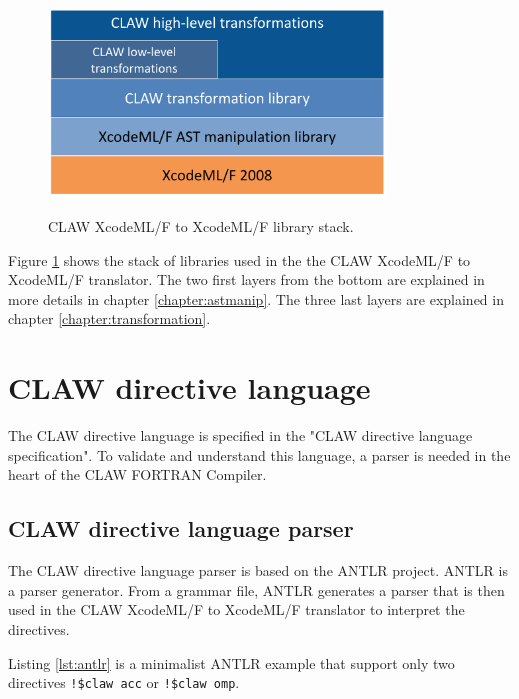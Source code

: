 \documentclass[a4paper, 11pt]{report}
\def\clawfcomp{CLAW FORTRAN Compiler\xspace}
\def\xcodeml{XcodeML/F\xspace}
\begin{document}
\begin{figure}[!ht]
  \centering
  \includegraphics[width=0.8\textwidth]{resources/cx2x_stack.png} \\
  \caption{CLAW \xcodeml to \xcodeml library stack.}
  \label{fig:cx2x_stack}
\end{figure}

Figure \ref{fig:cx2x_stack} shows the stack of libraries used in the the CLAW \xcodeml to \xcodeml translator. The two first layers from the bottom are explained in more details in chapter \ref{chapter:astmanip}. The three last layers are explained in chapter \ref{chapter:transformation}.


\chapter{CLAW directive language}
The CLAW directive language is specified in the "CLAW directive language specification". To validate and understand this language, a parser is needed in the heart of the \clawfcomp.

\section{CLAW directive language parser}
The CLAW directive language parser is based on the ANTLR project\cite{Parr:2013:DAR:2501720}. ANTLR is a parser generator. From a grammar file, ANTLR generates a parser that is then used in the CLAW \xcodeml to \xcodeml translator to interpret the directives. 



Listing \ref{lst:antlr} is a minimalist ANTLR example that support only two directives \lstinline|!$claw acc| or \lstinline|!$claw omp|.
\end{document}
